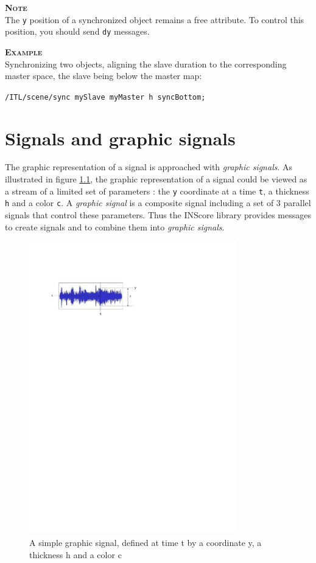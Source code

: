 \documentclass[a4paper,twoside]{report}
\newcommand{\toplevel}[1]	{\chapter{#1}}
\newcommand{\OSC}[1]		{\texttt{#1}}
\newcommand{\values}[1]		{\texttt{#1}}
\newcommand{\example}		{\textbf{\hspace{-1.5cm}\textbf{\textsc{Example }}}}
\newcommand{\note}	[1]		{\vspace{2mm}\textbf{\hspace{-1.03cm}\textbf{\textsc{Note #1}}}}
\newcommand{\sample}	[1]			{\vspace{-2mm}\begin{center}\colorbox{mygrey}{
								\begin{minipage}[t]{0.9\columnwidth} 
								{\small \texttt{#1}}
								\end{minipage}}\end{center}}
\begin{document}
\note{} \\
The \values{y} position of a synchronized object remains a free attribute. To control this position, you should send \OSC{dy} messages.  

\example \\
Synchronizing two objects, aligning the slave duration to the corresponding master space, the slave being below the master map:
\sample{/ITL/scene/sync mySlave myMaster h syncBottom;}


\toplevel{Signals and graphic signals}
\label{graphsig}

The graphic representation of a signal is approached with \emph{graphic signals}. As illustrated in figure \ref{graphimg}, the graphic representation of a signal could be viewed as a stream of a limited set of parameters : the \values{y} coordinate at a time \values{t}, a thickness \values{h} and a color \values{c}. 
A \emph{graphic signal} is a composite signal including a set of 3 parallel signals that control these parameters. Thus the INScore library provides messages to create signals and to combine them into \emph{graphic signals}. 

\begin{figure}[h]
	\centering \includegraphics[width=90mm]{imgs/graph}
 \caption{A simple graphic signal, defined at time t by a coordinate y, a thickness h and a color c}
 \label{graphimg}
\end{figure}
\end{document}
